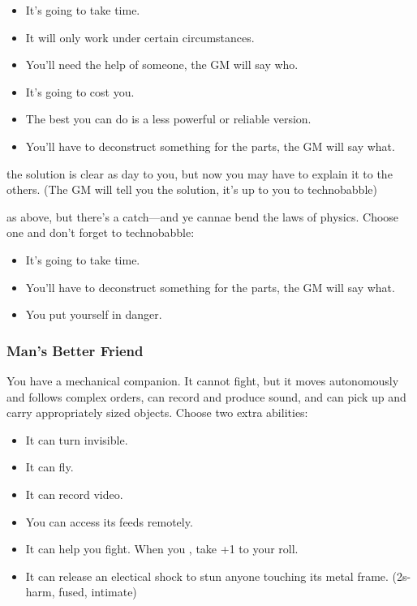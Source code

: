 \begin{itemize}
\item It's going to take time.
\item It will only work under certain circumstances.
\item You'll need the help of someone, the GM will say who.
\item It's going to cost you.
\item The best you can do is a less powerful or reliable version.
\item You’ll have to deconstruct something for the parts, the GM will say what.
\end{itemize}

{the solution is clear as day to you, but now you may have to explain it to the others. (The GM will tell you the solution, it's up to you to technobabble)}
{as above, but there's a catch---and ye cannae bend the laws of physics. Choose one and don't forget to technobabble:
\begin{itemize}
\item It's going to take time.
\item You’ll have to deconstruct something for the parts, the GM will say what.
\item You put yourself in danger.
\end{itemize}}


\subsubsection{Man's Better Friend}
You have a mechanical companion. It cannot fight, but it moves autonomously and follows complex orders, can record and produce sound, and can pick up and carry appropriately sized objects. Choose two extra abilities:
\begin{itemize}
\item It can turn invisible.
\item It can fly.
\item It can record video.
\item You can access its feeds remotely.
\item It can help you fight. When you , take +1 to your roll.
\item It can release an electical shock to stun anyone touching its metal frame. (2s-harm, fused, intimate)
\end{itemize}

